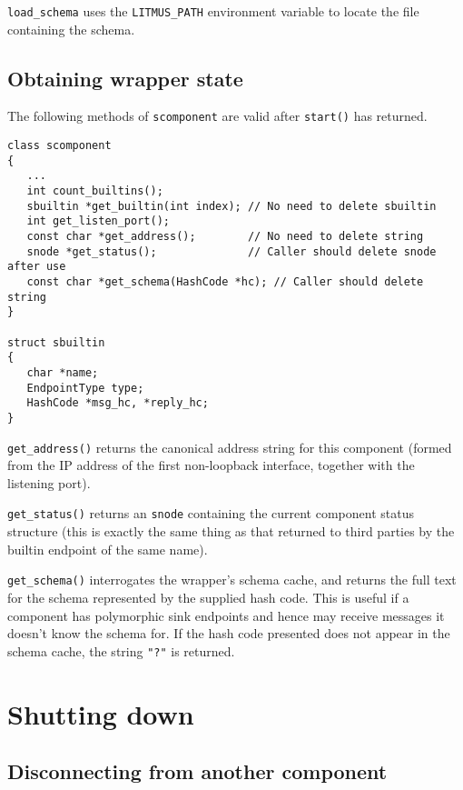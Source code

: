 \documentclass[12pt,a4paper,twoside]{article}
\renewcommand{\_}{\texttt{\symbol{95}}}
\begin{document}
\verb^load_schema^ uses the \verb^LITMUS_PATH^ environment variable
to locate the file containing the schema.


\subsection{Obtaining wrapper state}

The following methods of \verb^scomponent^ are valid after
\verb^start()^ has returned.

\begin{verbatim}
class scomponent
{
   ...
   int count_builtins();
   sbuiltin *get_builtin(int index); // No need to delete sbuiltin
   int get_listen_port();
   const char *get_address();        // No need to delete string
   snode *get_status();              // Caller should delete snode after use
   const char *get_schema(HashCode *hc); // Caller should delete string
}

struct sbuiltin
{
   char *name;
   EndpointType type;
   HashCode *msg_hc, *reply_hc;
}
\end{verbatim}

\verb^get_address()^ returns the canonical address string for this
component (formed from the IP address of the first non-loopback interface,
together with the listening port).

\verb^get_status()^ returns an \verb^snode^ containing the current
component status structure (this is exactly the same thing as that
returned to third parties by the builtin endpoint of the same name).

\verb^get_schema()^ interrogates the wrapper's schema cache, and
returns the full text for the schema represented by the supplied
hash code. This is useful if a component has polymorphic sink
endpoints and hence may receive messages it doesn't know the schema
for. If the hash code presented does not appear in the schema
cache, the string \verb^"?"^ is returned.

\section{Shutting down}

\subsection{Disconnecting from another component}
\end{document}
